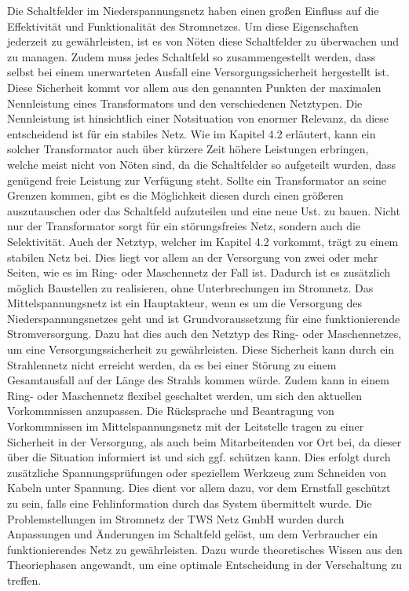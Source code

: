 Die Schaltfelder im Niederspannungsnetz haben einen großen Einfluss auf die Effektivität und Funktionalität des Stromnetzes. Um diese Eigenschaften jederzeit 
zu gewährleisten, ist es von Nöten diese Schaltfelder zu überwachen und zu managen. Zudem muss jedes Schaltfeld so zusammengestellt werden, dass selbst bei 
einem unerwarteten Ausfall eine Versorgungssicherheit hergestellt ist. Diese Sicherheit kommt vor allem aus den genannten Punkten der maximalen Nennleistung 
eines Transformators und den verschiedenen Netztypen. Die Nennleistung ist hinsichtlich einer Notsituation von enormer Relevanz, da diese entscheidend ist 
für ein stabiles Netz. Wie im Kapitel 4.2 erläutert, kann ein solcher Transformator auch über kürzere Zeit höhere Leistungen erbringen, welche meist nicht 
von Nöten sind, da die Schaltfelder so aufgeteilt wurden, dass genügend freie Leistung zur Verfügung steht. Sollte ein Transformator an seine Grenzen kommen, 
gibt es die Möglichkeit diesen durch einen größeren auszutauschen oder das Schaltfeld aufzuteilen und eine neue Ust. zu bauen. Nicht nur der Transformator 
sorgt für ein störungsfreies Netz, sondern auch die Selektivität.  Auch der Netztyp, welcher im Kapitel 4.2 vorkommt, trägt zu einem stabilen Netz bei. Dies 
liegt vor allem an der Versorgung von zwei oder mehr Seiten, wie es im Ring- oder Maschennetz der Fall ist. Dadurch ist es zusätzlich möglich Baustellen zu 
realisieren, ohne Unterbrechungen im Stromnetz. Das Mittelspannungsnetz ist ein Hauptakteur, wenn es um die Versorgung des Niederspannungsnetzes geht und 
ist Grundvoraussetzung für eine funktionierende Stromversorgung. Dazu hat dies auch den Netztyp des Ring- oder Maschennetzes, um eine Versorgungssicherheit 
zu gewährleisten. Diese Sicherheit kann durch ein Strahlennetz nicht erreicht werden, da es bei einer Störung zu einem Gesamtausfall auf der Länge des 
Strahls kommen würde. Zudem kann in einem Ring- oder Maschennetz flexibel geschaltet werden, um sich den aktuellen Vorkommnissen anzupassen. Die Rücksprache 
und Beantragung von Vorkommnissen im Mittelspannungsnetz mit der Leitstelle tragen zu einer Sicherheit in der Versorgung, als auch beim Mitarbeitenden vor 
Ort bei, da dieser über die Situation informiert ist und sich ggf. schützen kann. Dies erfolgt \zB durch zusätzliche Spannungsprüfungen oder speziellem 
Werkzeug zum Schneiden von Kabeln unter Spannung. Dies dient vor allem dazu, vor dem Ernstfall geschützt zu sein, falls eine Fehlinformation durch das 
System übermittelt wurde. Die Problemstellungen im Stromnetz der TWS Netz GmbH wurden durch Anpassungen und Änderungen im Schaltfeld gelöst, um dem 
Verbraucher ein funktionierendes Netz zu gewährleisten. Dazu wurde theoretisches Wissen aus den Theoriephasen angewandt, um eine optimale Entscheidung in 
der Verschaltung zu treffen. 

\clearpage